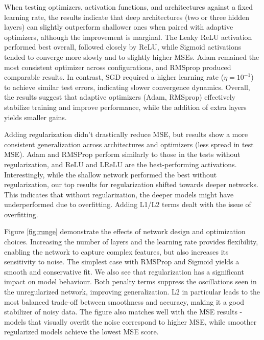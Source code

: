 \documentclass[amssymb,twocolumn,aps,floatfix]{revtex4-2}
\begin{document}
When testing optimizers, activation functions, and architectures against a fixed learning rate, the results indicate that deep architectures (two or three hidden layers) can slightly outperform shallower ones when paired with adaptive optimizers, although the improvement is marginal. The Leaky ReLU activation performed best overall, followed closely by ReLU, while Sigmoid activations tended to converge more slowly and to slightly higher MSEs. Adam remained the most consistent optimizer across configurations, and RMSprop produced comparable results. In contrast, SGD required a higher learning rate ($\eta = 10^{-1}$) to achieve similar test errors, indicating slower convergence dynamics. Overall, the results suggest that adaptive optimizers (Adam, RMSprop) effectively stabilize training and improve performance, while the addition of extra layers yields smaller gains. 

Adding regularization didn't drastically reduce MSE, but results show a more consistent generalization across architectures and optimizers (less spread in test MSE). Adam and RMSProp perform similarly to those in the tests without regularization, and ReLU and LReLU are the best-performing activations. Interestingly, while the shallow network performed the best without regularization, our top results for regularization shifted towards deeper networks. This indicates that without regularization, the deeper models might have underperformed due to overfitting. Adding L1/L2 terms dealt with the issue of overfitting. 

Figure \ref{fig:runge} demonstrate the effects of network design and optimization choices. Increasing the number of layers and the learning rate provides flexibility, enabling the network to capture complex features, but also increases its sensitivity to noise. The simplest case with RMSProp and Sigmoid yields a smooth and conservative fit. We also see that regularization has a significant impact on model behaviour. Both penalty terms suppress the oscillations seen in the unregularized network, improving generalization. L2 in particular leads to the most balanced trade-off between smoothness and accuracy, making it a good stabilizer of noisy data. The figure also matches well with the MSE results - models that visually overfit the noise correspond to higher MSE, while smoother regularized models achieve the lowest MSE score. 
\end{document}

